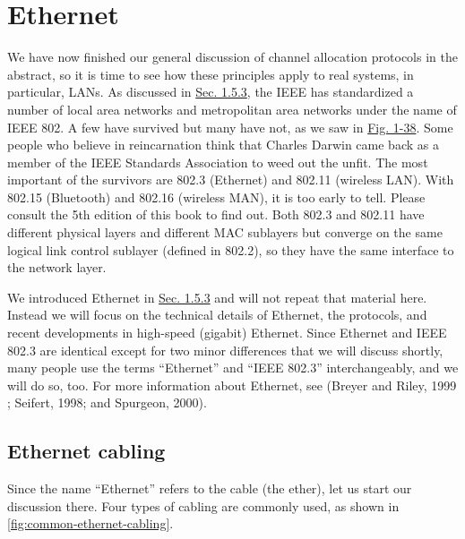\chapter{Ethernet}
\label{chap:ethernet}

We have now finished our general discussion of channel allocation
protocols in the abstract, so it is time to see how these principles
apply to real systems, in particular, LANs. As discussed in
\protect\hyperlink{0130661023_ch01lev1sec5.htmlux5cux23ch01lev2sec23}{Sec.
1.5.3}, the IEEE has standardized a number of local area networks and
metropolitan area networks under the name of IEEE 802. A few have
survived but many have not, as we saw in
\protect\hyperlink{0130661023_ch01lev1sec6.htmlux5cux23ch01fig38}{Fig.
1-38}. Some people who believe in reincarnation think that Charles
Darwin came back as a member of the IEEE Standards Association to weed
out the unfit. The most important of the survivors are 802.3 (Ethernet)
and 802.11 (wireless LAN). With 802.15 (Bluetooth) and 802.16 (wireless
MAN), it is too early to tell. Please consult the 5th edition of this
book to find out. Both 802.3 and 802.11 have different physical layers
and different MAC sublayers but converge on the same logical link
control sublayer (defined in 802.2), so they have the same interface to
the network layer.

We introduced Ethernet in
\protect\hyperlink{0130661023_ch01lev1sec5.htmlux5cux23ch01lev2sec23}{Sec.
1.5.3} and will not repeat that material here. Instead we will focus on
the technical details of Ethernet, the protocols, and recent
developments in high-speed (gigabit) Ethernet. Since Ethernet and IEEE
802.3 are identical except for two minor differences that we will
discuss shortly, many people use the terms ``Ethernet'' and ``IEEE
802.3'' interchangeably, and we will do so, too. For more information
about Ethernet, see (Breyer and Riley, 1999 ; Seifert, 1998; and
Spurgeon, 2000).

\section{Ethernet cabling}

Since the name ``Ethernet'' refers to the cable (the ether), let us start our discussion there.
Four types of cabling are commonly used, as shown in \cref{fig:common-ethernet-cabling}.


